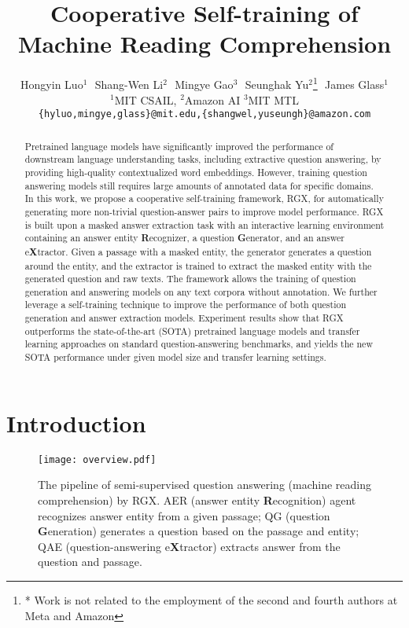 \documentclass[11pt,a4paper]{article}
\title{Cooperative Self-training of Machine Reading Comprehension}
\author{Hongyin Luo$^1$ $    $ Shang-Wen Li$^{2}$ $  $ Mingye Gao$^{3}$ $  $ Seunghak Yu$^2$\thanks{ * Work is not related to the employment of the second and fourth authors at Meta and Amazon} $    $ James Glass$^1$ \\
  $^{1}$MIT CSAIL, $^{2}$Amazon AI  $^{3}$MIT MTL\\
  {\tt \{hyluo,mingye,glass\}@mit.edu,\{shangwel,yuseungh\}@amazon.com}\\
}
\date{}
\begin{document}
\maketitle

\begin{abstract}
Pretrained language models have significantly improved the performance of downstream language understanding tasks, including extractive question answering, by providing high-quality contextualized word embeddings. However, training question answering models still requires large amounts of annotated data for specific domains. In this work, we propose a cooperative self-training framework, RGX, for automatically generating more non-trivial question-answer pairs to improve model performance. RGX is built upon a masked answer extraction task with an interactive learning environment containing an answer entity \textbf{R}ecognizer, a question \textbf{G}enerator, and an answer e\textbf{X}tractor. Given a passage with a masked entity, the generator generates a question around the entity, and the extractor is trained to extract the masked entity with the generated question and raw texts. The framework allows the training of question generation and answering models on any text corpora without annotation.
We further leverage a self-training technique to improve the performance of both question generation and answer extraction models.
Experiment results show that RGX outperforms the state-of-the-art (SOTA) pretrained language models and transfer learning approaches on standard question-answering benchmarks, and yields the new SOTA performance under given model size and transfer learning settings.

\end{abstract}

\section{Introduction}
\label{sec:intro}
\begin{figure}[t]
\centering
\texttt{[image: overview.pdf]}
\caption{The pipeline of semi-supervised question answering (machine reading comprehension) by RGX. AER (answer entity \textbf{R}ecognition) agent recognizes answer entity from a given passage; QG (question \textbf{G}eneration) generates a question based on the passage and entity; QAE (question-answering e\textbf{X}tractor) extracts answer from the question and passage.}
\label{fig:example}
\end{figure}
\end{document}
